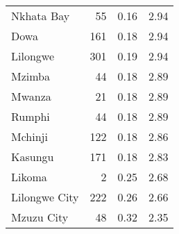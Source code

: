 \begin{tabular}{lrrr}
Nkhata Bay    &      55 &           0.16 &                2.94 \\
Dowa          &     161 &           0.18 &                2.94 \\
Lilongwe      &     301 &           0.19 &                2.94 \\
Mzimba        &      44 &           0.18 &                2.89 \\
Mwanza        &      21 &           0.18 &                2.89 \\
Rumphi        &      44 &           0.18 &                2.89 \\
Mchinji       &     122 &           0.18 &                2.86 \\
Kasungu       &     171 &           0.18 &                2.83 \\
Likoma        &       2 &           0.25 &                2.68 \\
Lilongwe City &     222 &           0.26 &                2.66 \\
Mzuzu City    &      48 &           0.32 &                2.35 \\
\bottomrule
\end{tabular}
